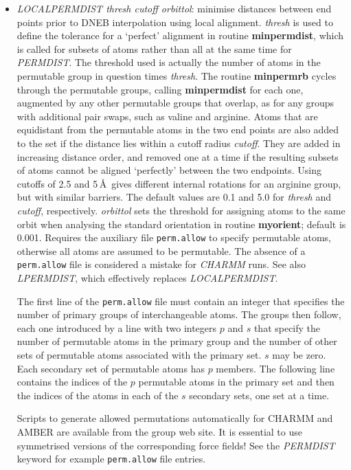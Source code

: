 \documentclass[12pt,a4paper,dvips]{article}
\begin{document}
\begin{itemize}
\item {\it LOCALPERMDIST thresh cutoff orbittol\/}: minimise distances between end points
prior to DNEB interpolation using local alignment.
{\it thresh} is used to define the tolerance for a `perfect' alignment
in routine {\bf minpermdist}, which is called for subsets of atoms
rather than all at the same time for {\it PERMDIST}.
The threshold used is actually the number of atoms in the permutable
group in question times {\it thresh\/}.
The routine {\bf minpermrb} cycles through the permutable groups,
calling {\bf minpermdist} for each one, augmented by any other permutable
groups that overlap, as for any groups with additional pair swaps, such
as valine and arginine.
Atoms that are equidistant from the permutable atoms in the two end points
are also added to the set if the distance lies within a cutoff
radius {\it cutoff\/}.
They are added in increasing distance order, and removed one at a time 
if the resulting subsets of atoms cannot be aligned `perfectly' between
the two endpoints.
Using cutoffs of 2.5 and 5\,\AA\ gives different internal rotations for
an arginine group, but with similar barriers. 
The default values are 0.1 and 5.0 for {\it thresh} and {\it cutoff\/},
respectively.
{\it orbittol\/} sets the threshold for assigning atoms to the
same orbit when analysing the standard orientation in routine {\bf myorient};
default is 0.001.
Requires the auxiliary file {\tt perm.allow} to specify permutable atoms, otherwise
all atoms are assumed to be permutable. The absence of a {\tt perm.allow}
file is considered a mistake for {\it CHARMM\/} runs.
See also {\it LPERMDIST\/}, which effectively replaces {\it LOCALPERMDIST\/}.

The first line of the {\tt perm.allow} file must contain an integer
that specifies the number of primary groups of interchangeable atoms.
The groups then follow, each one introduced by a line with two integers $p$ and $s$
that specify the number of permutable atoms in the primary group and the number of other sets
of permutable atoms associated with the primary set.
$s$ may be zero.
Each secondary set of permutable atoms has $p$ members.
The following line contains the indices of the $p$ permutable atoms 
in the primary set and then
the indices of the atoms in each of the $s$ secondary sets, one set at 
a time.

Scripts to generate allowed permutations automatically for CHARMM and AMBER are available from
the group web site. It is essential to use symmetrised versions of the corresponding
force fields! See the {\it PERMDIST\/} keyword for example {\tt perm.allow} file entries.


\end{itemize}
\end{document}
